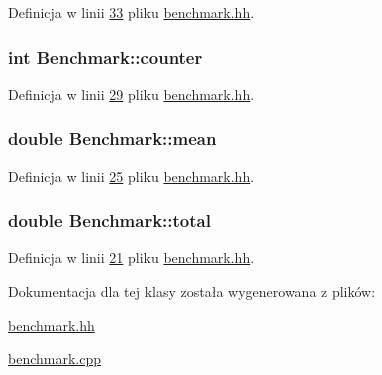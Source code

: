 Definicja w linii \hyperlink{benchmark_8hh_source_l00033}{33} pliku \hyperlink{benchmark_8hh_source}{benchmark.\-hh}.

\hypertarget{class_benchmark_a3a56c7dad0b21e490f3024d5d0027f31}{
\subsubsection[{counter}]{\setlength{\rightskip}{0pt plus 5cm}int Benchmark\-::counter\hspace{0.3cm}{\ttfamily [private]}}}\label{class_benchmark_a3a56c7dad0b21e490f3024d5d0027f31}


Definicja w linii \hyperlink{benchmark_8hh_source_l00029}{29} pliku \hyperlink{benchmark_8hh_source}{benchmark.\-hh}.

\hypertarget{class_benchmark_aa88092b6164ad7d1243162d3012f729a}{
\subsubsection[{mean}]{\setlength{\rightskip}{0pt plus 5cm}double Benchmark\-::mean\hspace{0.3cm}{\ttfamily [private]}}}\label{class_benchmark_aa88092b6164ad7d1243162d3012f729a}


Definicja w linii \hyperlink{benchmark_8hh_source_l00025}{25} pliku \hyperlink{benchmark_8hh_source}{benchmark.\-hh}.

\hypertarget{class_benchmark_a7130c0718e3a3ab2fea70285dab122a2}{
\subsubsection[{total}]{\setlength{\rightskip}{0pt plus 5cm}double Benchmark\-::total\hspace{0.3cm}{\ttfamily [private]}}}\label{class_benchmark_a7130c0718e3a3ab2fea70285dab122a2}


Definicja w linii \hyperlink{benchmark_8hh_source_l00021}{21} pliku \hyperlink{benchmark_8hh_source}{benchmark.\-hh}.



Dokumentacja dla tej klasy została wygenerowana z plików\-:\begin{DoxyCompactItemize}
\item 
\hyperlink{benchmark_8hh}{benchmark.\-hh}\item 
\hyperlink{benchmark_8cpp}{benchmark.\-cpp}\end{DoxyCompactItemize}
